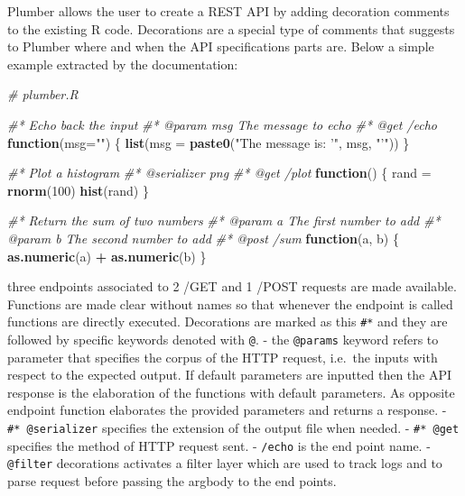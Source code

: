 \documentclass[
  12pt,
  a4paper,
  oneside]{book}
\newenvironment{Shaded}{\begin{snugshade}}{\end{snugshade}}
\newcommand{\CommentTok}[1]{\textcolor[rgb]{0.56,0.35,0.01}{\textit{#1}}}
\newcommand{\ControlFlowTok}[1]{\textcolor[rgb]{0.13,0.29,0.53}{\textbf{#1}}}
\newcommand{\DataTypeTok}[1]{\textcolor[rgb]{0.13,0.29,0.53}{#1}}
\newcommand{\DecValTok}[1]{\textcolor[rgb]{0.00,0.00,0.81}{#1}}
\newcommand{\KeywordTok}[1]{\textcolor[rgb]{0.13,0.29,0.53}{\textbf{#1}}}
\newcommand{\NormalTok}[1]{#1}
\newcommand{\OperatorTok}[1]{\textcolor[rgb]{0.81,0.36,0.00}{\textbf{#1}}}
\newcommand{\StringTok}[1]{\textcolor[rgb]{0.31,0.60,0.02}{#1}}
\theoremstyle{definition}
\theoremstyle{definition}
\theoremstyle{definition}
\theoremstyle{remark}
\begin{document}
Plumber allows the user to create a REST API by adding decoration comments to the existing R code. Decorations are a special type of comments that suggests to Plumber where and when the API specifications parts are. Below a simple example extracted by the documentation:

\begin{Shaded}
\begin{Highlighting}[]
\CommentTok{# plumber.R}

\CommentTok{#* Echo back the input}
\CommentTok{#* @param msg The message to echo}
\CommentTok{#* @get /echo}
\ControlFlowTok{function}\NormalTok{(}\DataTypeTok{msg=}\StringTok{""}\NormalTok{) \{}
  \KeywordTok{list}\NormalTok{(}\DataTypeTok{msg =} \KeywordTok{paste0}\NormalTok{(}\StringTok{"The message is: '"}\NormalTok{, msg, }\StringTok{"'"}\NormalTok{))}
\NormalTok{\}}

\CommentTok{#* Plot a histogram}
\CommentTok{#* @serializer png}
\CommentTok{#* @get /plot}
\ControlFlowTok{function}\NormalTok{() \{}
\NormalTok{  rand =}\StringTok{ }\KeywordTok{rnorm}\NormalTok{(}\DecValTok{100}\NormalTok{)}
  \KeywordTok{hist}\NormalTok{(rand)}
\NormalTok{\}}

\CommentTok{#* Return the sum of two numbers}
\CommentTok{#* @param a The first number to add}
\CommentTok{#* @param b The second number to add}
\CommentTok{#* @post /sum}
\ControlFlowTok{function}\NormalTok{(a, b) \{}
  \KeywordTok{as.numeric}\NormalTok{(a) }\OperatorTok{+}\StringTok{ }\KeywordTok{as.numeric}\NormalTok{(b)}
\NormalTok{\}}
\end{Highlighting}
\end{Shaded}

three endpoints associated to 2 /GET and 1 /POST requests are made available. Functions are made clear without names so that whenever the endpoint is called functions are directly executed.
Decorations are marked as this \texttt{\#*} and they are followed by specific keywords denoted with \texttt{@}.
- the \texttt{@params} keyword refers to parameter that specifies the corpus of the HTTP request, i.e.~the inputs with respect to the expected output. If default parameters are inputted then the API response is the elaboration of the functions with default parameters. As opposite endpoint function elaborates the provided parameters and returns a response.
- \texttt{\#*\ @serializer} specifies the extension of the output file when needed.
- \texttt{\#*\ @get} specifies the method of HTTP request sent.
- \texttt{/echo} is the end point name.
- \texttt{@filter} decorations activates a filter layer which are used to track logs and to parse request before passing the argbody to the end points.
\end{document}
